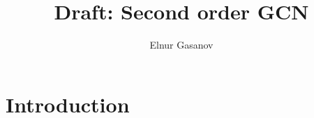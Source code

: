 \documentclass{article}
\title{Draft: Second order GCN}
\date{}
\author{Elnur Gasanov}
\begin{document}
\maketitle
\section{Introduction}
\end{document}
